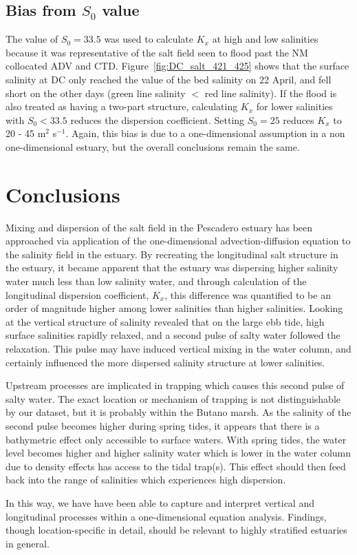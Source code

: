 \subsection{Bias from $S_0$ value}
The value of $S_0 = 33.5$ was used to calculate $K_x$ at high and low salinities because it was representative of the salt field seen to flood past the NM collocated ADV and CTD. Figure~\ref{fig:DC_salt_421_425} shows that the surface salinity at DC only reached the value of the bed salinity on 22 April, and fell short on the other days (green line salinity $<$ red line salinity). If the flood is also treated as having a two-part structure, calculating $K_x$ for lower salinities with $S_0<33.5$ reduces the dispersion coefficient. Setting $S_0=25$ reduces $K_x$ to 20 - 45 m$^2$ s$^{-1}$. Again, this bias is due to a one-dimensional assumption in a non one-dimensional estuary, but the overall conclusions remain the same. 

\section{Conclusions}

Mixing and dispersion of the salt field in the Pescadero estuary has been approached via application of the one-dimensional advection-diffusion equation to the salinity field in the estuary. By recreating the longitudinal salt structure in the estuary, it became apparent that the estuary was dispersing higher salinity water much less than low salinity water, and through calculation of the longitudinal dispersion coefficient, $K_x$, this difference was quantified to be an order of magnitude higher among lower salinities than higher salinities. Looking at the vertical structure of salinity revealed that on the large ebb tide, high surface salinities rapidly relaxed, and a second pulse of salty water followed the relaxation. This pulse may have induced vertical mixing in the water column, and certainly influenced the more dispersed salinity structure at lower salinities. 

Upstream processes are implicated in trapping which causes this second pulse of salty water.  The exact location or mechanism of trapping is not distinguishable by our dataset, but it is probably within the Butano marsh. As the salinity of the second pulse becomes higher during spring tides, it appears that there is a bathymetric effect only accessible to surface waters. With spring tides, the water level becomes higher and higher salinity water which is lower in the water column due to density effects has access to the tidal trap(s). This effect should then feed back into the range of salinities which experiences high dispersion.

In this way, we have have been able to capture and interpret vertical and longitudinal processes within a one-dimensional equation analysis. Findings, though location-specific in detail, should be relevant to highly stratified estuaries in general. 

